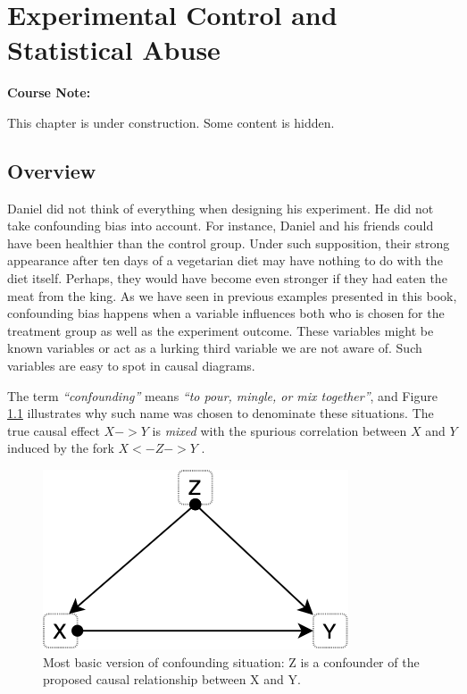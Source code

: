 \documentclass[
]{book}
\begin{document}
\hypertarget{stats-abuse}{%
\chapter{Experimental Control and Statistical Abuse}\label{stats-abuse}}

\begin{notebox}

\begin{center}
\textbf{Course Note:}

\end{center}

This chapter is under construction. Some content is hidden.

\end{notebox}

\hypertarget{stats-overview}{%
\section{Overview}\label{stats-overview}}

Daniel did not think of everything when designing his experiment. He did not take confounding bias into account. For instance, Daniel and his friends could have been healthier than the control group. Under such supposition, their strong appearance after ten days of a vegetarian diet may have nothing to do with the diet itself. Perhaps, they would have become even stronger if they had eaten the meat from the king. As we have seen in previous examples presented in this book, confounding bias happens when a variable influences both who is chosen for the treatment group as well as the experiment outcome. These variables might be known variables or act as a lurking third variable we are not aware of. Such variables are easy to spot in causal diagrams.

The term \emph{``confounding''} means \emph{``to pour, mingle, or mix together''}, and Figure \ref{fig:confounder-simple} illustrates why such name was chosen to denominate these situations. The true causal effect \(X -> Y\) is \emph{mixed} with the spurious correlation between \(X\) and \(Y\) induced by the fork \(X <- Z -> Y\) \citep{book-of-why}.

\begin{figure}

{\centering \includegraphics[width=0.33\linewidth]{Figures/causal_diagram_confounder_simple} 

}

\caption{Most basic version of confounding situation: Z is a confounder of the proposed causal relationship between X and Y.}\label{fig:confounder-simple}
\end{figure}
\end{document}
